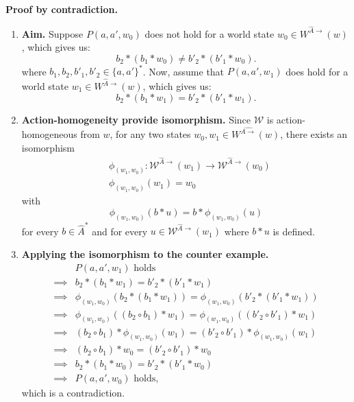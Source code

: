 \begin{proofE}
\textbf{Proof by contradiction.}
\begin{enumerate}
    \item \textbf{Aim.}
    Suppose $P(a, a', w_{0})$ does not hold for a world state $w_{0} \in W^{\hat{A}\to}(w)$, which gives us:
    \begin{equation}
        b_{2} \ast (b_{1} \ast w_{0}) \neq b'_{2} \ast (b'_{1} \ast w_{0}).
    \end{equation}
    where $b_{1}, b_{2}, b'_{1}, b'_{2} \in \{a, a'\}^{*}$.
    Now, assume that $P(a, a', w_{1})$ does hold for a world state $w_{1} \in W^{\hat{A}\to}(w)$, which gives us:
    \begin{equation}
        b_{2} \ast (b_{1} \ast w_{1}) = b'_{2} \ast (b'_{1} \ast w_{1}).
    \end{equation}
    
    \item \textbf{Action-homogeneity provide isomorphism.}
    Since $\mathscr{W}$ is action-homogeneous from $w$, for any two states $w_{0}, w_{1} \in W^{\hat{A\to}}(w)$, there exists an isomorphism
    \begin{align}
        & \phi_{(w_{1}, w_{0})}: \mathscr{W}^{\hat{A}\to}(w_{1}) \to \mathscr{W}^{\hat{A}\to}(w_{0}) \\
        & \phi_{(w_{1}, w_{0})}(w_{1}) = w_{0}
    \end{align}
    with
    \begin{equation}
        \phi_{(w_{1}, w_{0})}(b \ast u) = b \ast \phi_{(w_{1}, w_{0})}(u)
    \end{equation}
    for every $b \in \hat{A}^{*}$ and for every $u \in \mathscr{W}^{\hat{A}\to}(w_{1})$ where $b \ast u$ is defined.

    \item \textbf{Applying the isomorphism to the counter example.}
    \begin{align}
        & P(a, a', w_{1}) \text{ holds}  \\
        \implies & b_{2} \ast (b_{1} \ast w_{1}) = b'_{2} \ast (b'_{1} \ast w_{1}) \\
        \implies & \phi_{(w_{1}, w_{0})}(b_{2} \ast (b_{1} \ast w_{1})) = \phi_{(w_{1}, w_{0})}(b'_{2} \ast (b'_{1} \ast w_{1})) \\
        \implies & \phi_{(w_{1}, w_{0})}((b_{2} \circ b_{1}) \ast w_{1}) = \phi_{(w_{1}, w_{0})}((b'_{2} \circ b'_{1}) \ast w_{1}) \\
        \implies & (b_{2} \circ b_{1}) \ast \phi_{(w_{1}, w_{0})}(w_{1}) = (b'_{2} \circ b'_{1}) \ast \phi_{(w_{1}, w_{0})}(w_{1}) \\
        \implies & (b_{2} \circ b_{1}) \ast w_{0} = (b'_{2} \circ b'_{1}) \ast w_{0} \\
        \implies & b_{2} \ast (b_{1} \ast w_{0}) = b'_{2} \ast (b'_{1} \ast w_{0}) \\
        \implies & P(a, a', w_{0}) \text{ holds},
    \end{align}
    which is a contradiction.
\end{enumerate}
\end{proofE}



